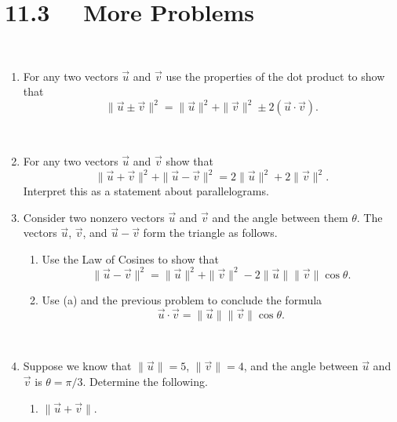 \section*{11.3 \ \ More Problems}

\ 


\begin{enumerate}
\item For any two vectors $\vec{u}$ and $\vec{v}$ use the properties of the dot product to show that
\[
\| \vec{u} \pm \vec{v} \|^2 = \| \vec{u} \|^2 + \| \vec{v} \|^2 \pm 2 (\vec{u} \cdot \vec{v}).
\]

\ 

\item For any two vectors $\vec{u}$ and $\vec{v}$ show that
\[
\| \vec{u} + \vec{v} \|^2 + \| \vec{u} - \vec{v} \|^2 = 2\| \vec{u} \|^2 + 2\| \vec{v} \|^2.
\]
Interpret this as a statement about parallelograms.  \\

\item  Consider two nonzero vectors $\vec{u}$ and $\vec{v}$ and the angle between them $\theta$.  The vectors $\vec{u}$, $\vec{v}$, and $\vec{u} - \vec{v}$ form the triangle as follows.
\begin{center}
\end{center}
\begin{enumerate}
\item Use the Law of Cosines to show that
\[
\| \vec{u} - \vec{v} \|^2 = \| \vec{u} \|^2 + \| \vec{v} \|^2 - 2 \| \vec{u} \| \| \vec{v} \| \cos \theta.
\]

\item  Use (a) and the previous problem to conclude the formula 
\[
\vec{u} \cdot \vec{v} = \| \vec{u} \| \| \vec{v} \| \cos \theta.
\] 
\end{enumerate} 

\ 

\item  Suppose we know that $\| \vec{u} \| = 5$, $\| \vec{v} \| = 4$, and the angle between $\vec{u}$ and $\vec{v}$ is $\theta = \pi/3$. Determine the following.
\begin{enumerate}
\item  $\| \vec{u} + \vec{v} \|$.


\end{enumerate}
\end{enumerate}
